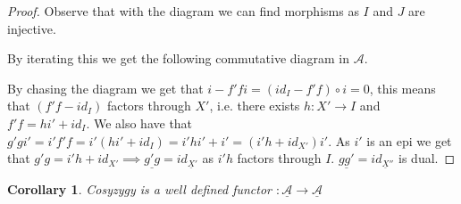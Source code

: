 \documentclass[11pt]{article}
\newtheorem{corollary}{Corollary}[theorem]
\theoremstyle{definition}
\theoremstyle{remark}
\begin{document}
            \begin{proof}
                Observe that with the diagram we can find morphisms as $I$ and $J$ are injective.
                \begin{center}
                \end{center}
                By iterating this we get the following commutative diagram in $\mathcal{A}$.
                \begin{center}
                \end{center}
                By chasing the diagram we get that $i-f'fi=(id_I-f'f)\circ i = 0$, this means that $(f'f-id_I)$ factors through $X'$, i.e. there exists $h:X'\rightarrow I$ and $f'f = hi'+id_I$. We also have that $g'gi' = i'f'f = i'(hi' +id_I) = i'hi' + i' = (i'h+id_{X'})i'$. As $i'$ is an epi we get that $g'g = i'h + id_{X'} \implies \underline{g'g}=id_{\underline{X}'}$ as $i'h$ factors through $I$. $\underline{gg'}=id_{\underline{X}''}$ is dual.
            \end{proof}

            \begin{corollary}
                Cosyzygy is a well defined functor $:\underline{\mathcal{A}}\rightarrow\underline{\mathcal{A}}$
            \end{corollary}
\end{document}
